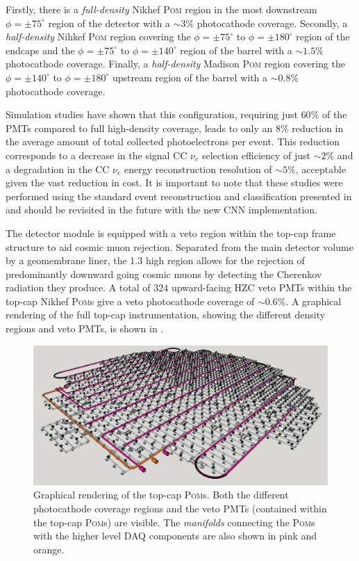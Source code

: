 Firstly, there is a \emph{full-density} Nikhef \textsc{Pom} region in the most downstream
$\phi=\pm75^{\circ}$ region of the detector with a $\sim3\%$ photocathode coverage. Secondly, a
\emph{half-density} Nihkef \textsc{Pom} region covering the $\phi=\pm75^{\circ}$ to
$\phi=\pm180^{\circ}$ region of the endcaps and the $\phi=\pm75^{\circ}$ to $\phi=\pm140^{\circ}$
region of the barrel with a $\sim1.5\%$ photocathode coverage. Finally, a \emph{half-density}
Madison \textsc{Pom} region covering the $\phi=\pm140^{\circ}$ to $\phi=\pm180^{\circ}$ upstream
region of the barrel with a $\sim0.8\%$ photocathode coverage. 

Simulation studies have shown that this configuration, requiring just $60\%$ of the PMTs compared
to full high-density coverage, leads to only an $8\%$ reduction in the average amount of total
collected photoelectrons per event. This reduction corresponds to a decrease in the signal CC
$\nu_{e}$ selection efficiency of just $\sim2\%$ and a degradation in the CC $\nu_{e}$ energy
reconstruction resolution of $\sim5\%$, acceptable given the vast reduction in cost. It is
important to note that these studies were performed using the standard event reconstruction and
classification presented in  and should be revisited in the future with
the new CNN implementation.

The \chipsfive detector module is equipped with a veto region within the top-cap frame structure
to aid cosmic muon rejection. Separated from the main detector volume by a geomembrane liner, the
\SI{1.3}{} high region allows for the rejection of predominantly downward going cosmic
muons by detecting the Cherenkov radiation they produce. A total of $324$ upward-facing HZC veto
PMTs within the top-cap Nikhef \textsc{Pom}s give a veto photocathode coverage of $\sim0.6\%$. A
graphical rendering of the full top-cap instrumentation, showing the different density regions and
veto PMTs, is shown in .

\begin{figure} %
    \includegraphics[width=\textwidth]{diagrams/4-chips/top_cap.pdf}
    \caption[Graphical rendering of the top-cap Planar Optical Modules]
    {Graphical rendering of the top-cap \textsc{Pom}s. Both the different photocathode coverage
        regions and the veto PMTs (contained within the top-cap \textsc{Pom}s) are visible. The
        \emph{manifolds} connecting the \textsc{Pom}s with the higher level DAQ components are
        also shown in pink and orange.}
    \label{fig:top_cap}
\end{figure}

